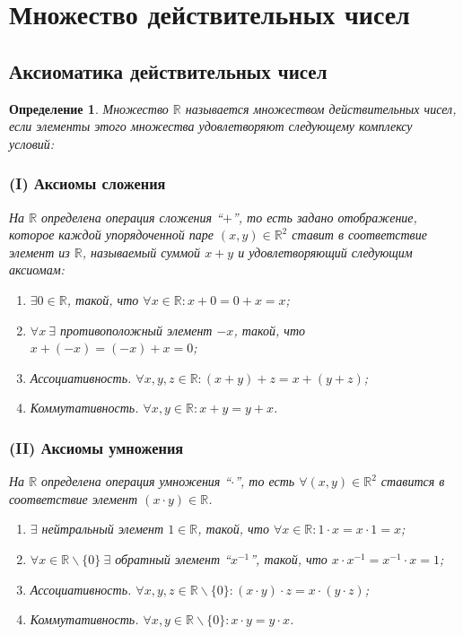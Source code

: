 \documentclass[a4paper,12pt]{article} %
\newtheorem{definition}{Определение}[section]
\theoremstyle{remark}
\theoremstyle{definition}
\begin{document}
\section{Множество действительных чисел}
\subsection{Аксиоматика действительных чисел}
\begin{definition}
	Множество $\mathbb{R}$ называется множеством действительных чисел, если элементы этого множества удовлетворяют следующему комплексу условий:
	\subsubsection*{(I) Аксиомы сложения}
	На $\mathbb{R}$ определена операция сложения  ``$+$'', то есть задано отображение, которое каждой упорядоченной паре $(x, y)\in \mathbb{R}^2$ ставит в соответствие элемент из $\mathbb{R}$, называемый суммой $x+y$ и удовлетворяющий следующим аксиомам:
		\begin{enumerate}
			\item $\exists 0\in \mathbb{R}$, такой, что $\forall x\in \mathbb{R}:x+0=0+x=x$;
			\item $\forall x \ \exists$ противоположный элемент $-x$, такой, что $x+(-x)=(-x)+x=0$;
			\item Ассоциативность. $\forall x, y, z\in \mathbb{R}:(x+y)+z=x+(y+z)$;
			\item Коммутативность. $\forall x, y\in \mathbb{R}:x+y=y+x$.
		\end{enumerate}
	\subsubsection*{(II) Аксиомы умножения}
	На $\mathbb{R}$ определена операция умножения ``$\cdot$'', то есть $\forall(x, y)\in\mathbb{R}^2$ ставится в соответствие элемент $(x\cdot y)\in \mathbb{R}$.
		\begin{enumerate}
			\item $\exists $ нейтральный элемент $1\in \mathbb{R}$, такой, что $\forall x\in \mathbb{R}:1\cdot x=x\cdot 1=x$;
			\item $\forall x\in \mathbb{R}\backslash\{0\} \ \exists $ обратный элемент ``$x^{-1}$'', такой, что $x\cdot x^{-1}=x^{-1}\cdot x=1$;
			\item Ассоциативность. $\forall x, y, z\in \mathbb{R}\backslash\{0\}:(x\cdot y)\cdot z=x\cdot (y\cdot z)$;
			\item Коммутативность. $\forall x, y\in \mathbb{R}\backslash\{0\}:x\cdot y=y\cdot x$.
		\end{enumerate}

\end{definition}
\end{document}
